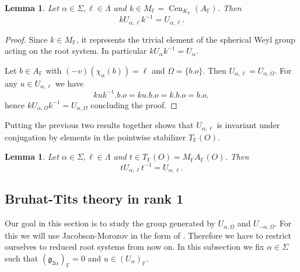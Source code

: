 \documentclass[12pt]{amsart}
\newcommand{\F}{\mathbb{F} }
\newcommand{\frakg}{\mathfrak{g}}
\numberwithin{equation}{section}
\newtheorem{lemma}[theorem]{Lemma}
\theoremstyle{remark} %
\begin{document}
\begin{lemma}\label{lem:BTkUk}
	Let $\alpha \in \Sigma, \ell \in \Lambda$ and $k \in M_\F = \operatorname{Cen}_{K_\F}(A_\F)$. Then
	$$
	kU_{\alpha,\ell}k^{-1}= U_{\alpha,\ell}.
	$$
\end{lemma}
\begin{proof}
	Since $k \in M_\F$, it represents the trivial element %
	of the spherical Weyl group acting on the root system. In particular $kU_{\alpha}k^{-1} = %
	U_{\alpha}$. 
	
	Let $b\in A_\F$ with $(-v)(\chi_\alpha(b))= \ell$ and $\Omega = \{b.o\}$. Then $U_{\alpha,\ell} = U_{\alpha, \Omega}$. For any $u\in U_{\alpha,\ell}$ we have
	$$
	kuk^{-1}.b.o = ku.b.o = k.b.o = b.o,
	$$
	hence $kU_{\alpha,\Omega}k^{-1} = U_{\alpha, \Omega}$ concluding the proof.
\end{proof}

Putting the previous two results together shows that $U_{\alpha,\ell}$ is invariant under conjugation by elements in the pointwise stabilizer $T_\F(O)$.
\begin{lemma}\label{lem:BTtUt}
	Let $\alpha \in \Sigma, \ell \in \Lambda$ and $t \in T_\F(O)=M_\F A_\F(O)$. Then
	$$
	t U_{\alpha,\ell} t^{-1} = U_{\alpha,\ell}.
	$$
\end{lemma}

\subsection{Bruhat-Tits theory in rank 1} \label{sec:BT_rank_1}
Our goal in this section is to study the group generated by $U_{\alpha, \Omega}$ and $U_{-\alpha, \Omega}$. For this we will use Jacobson-Morozov in the form of \cite[Proposition \ref{I-prop:Jacobson_Morozov_real_closed}]{AppAGRCF}. Therefore we have to restrict ourselves to reduced root systems from now on. In this subsection we fix $\alpha \in \Sigma$ such that $(\frakg_{2\alpha})_\F = 0$ and $u \in (U_\alpha)_\F$.
\end{document}

